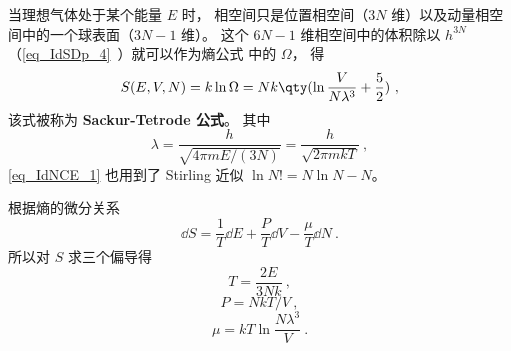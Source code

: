 
\begin{issues}
\issueDraft
\end{issues}


当理想气体处于某个能量 $E$ 时， 相空间只是位置相空间（$3N$ 维）以及动量相空间中的一个球表面（$3N-1$ 维）。 这个 $6N - 1$ 维相空间中的体积除以 $h^{3N}$ （\autoref{eq_IdSDp_4}~）就可以作为熵公式%
中的 $\Omega$， 得
\begin{equation}\label{eq_IdNCE_1}
S(E, V, N) = k\ln \Omega  = Nk \qty(\ln \frac{V}{N\lambda^3} + \frac52)~,
\end{equation}
该式被称为 \textbf{Sackur-Tetrode 公式}。 其中
\begin{equation}\label{eq_IdNCE_2}
\lambda = \frac{h}{\sqrt{4\pi mE/(3N)}} = \frac{h}{\sqrt{2\pi mkT}}~,
\end{equation}
\autoref{eq_IdNCE_1} 也用到了 Stirling 近似 %
$\ln N! = N\ln N - N$。

根据熵的微分关系 %
\begin{equation}
\dd{S} = \frac{1}{T} \dd{E} + \frac{P}{T} \dd{V} - \frac{\mu}{T} \dd{N}~.
\end{equation}
所以对 $S$ 求三个偏导得
\begin{equation}
T = \frac{2E}{3Nk}~,
\end{equation}
\begin{equation}
P = NkT/V~,
\end{equation}
\begin{equation}
\mu = kT \ln \frac{N\lambda^3}{V}~.
\end{equation}
